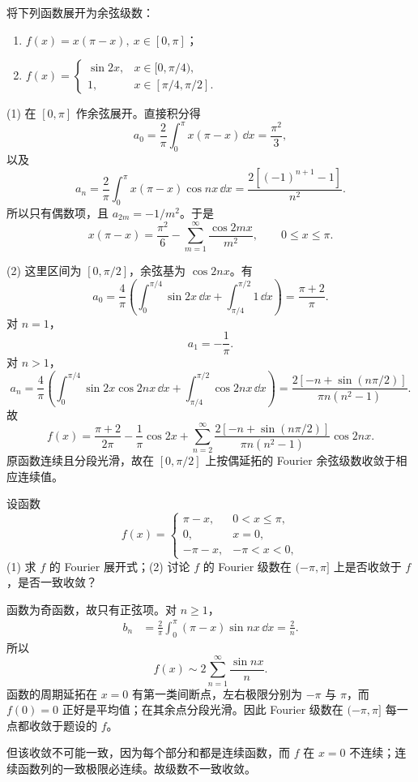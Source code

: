 \begin{xexercise}[6]
将下列函数展开为余弦级数：
  \begin{enumerate}[label=(\arabic*)]
    \item $f(x)=x(\pi-x),\ x\in[0,\pi]$；
    \item $f(x)=\begin{cases}\sin2x,&x\in[0,\pi/4),\\1,&x\in[\pi/4,\pi/2].\end{cases}$
  \end{enumerate}
\end{xexercise}
\begin{xsolution}
(1) 在 $[0,\pi]$ 作余弦展开。直接积分得
\[
  a_0=\frac2\pi\int_0^\pi x(\pi-x)\,\dd x=\frac{\pi^2}{3},
\]
以及
\[
  a_n=\frac2\pi\int_0^\pi x(\pi-x)\cos nx\,\dd x
  =\frac{2[(-1)^{n+1}-1]}{n^2}.
\]
所以只有偶数项，且 $a_{2m}=-1/m^2$。于是
\[
  \boxed{\displaystyle
  x(\pi-x)=\frac{\pi^2}{6}-
  \sum_{m=1}^{\infty}\frac{\cos2mx}{m^2},
  \qquad0\le x\le\pi }.
\]

(2) 这里区间为 $[0,\pi/2]$，余弦基为 $\cos2nx$。有
\[
  a_0=\frac4\pi\left(
  \int_0^{\pi/4}\sin2x\,\dd x+
  \int_{\pi/4}^{\pi/2}1\,\dd x\right)
  =\frac{\pi+2}{\pi}.
\]
对 $n=1$，
\[
  a_1=-\frac1\pi.
\]
对 $n>1$，
\[
  a_n=\frac4\pi\left(
  \int_0^{\pi/4}\sin2x\cos2nx\,\dd x+
  \int_{\pi/4}^{\pi/2}\cos2nx\,\dd x\right)
  =\frac{2[-n+\sin(n\pi/2)]}{\pi n(n^2-1)}.
\]
故
\[
  \boxed{\displaystyle
  f(x)=\frac{\pi+2}{2\pi}-\frac1\pi\cos2x
  +\sum_{n=2}^{\infty}
  \frac{2[-n+\sin(n\pi/2)]}{\pi n(n^2-1)}\cos2nx }.
\]
原函数连续且分段光滑，故在 $[0,\pi/2]$ 上按偶延拓的 Fourier 余弦级数收敛于相应连续值。
\end{xsolution}


\begin{xexercise}[7]
设函数
  \[
    f(x)=\begin{cases}
      \pi-x,&0<x\le\pi,\\
      0,&x=0,\\
      -\pi-x,&-\pi<x<0,
    \end{cases}
  \]
  (1) 求 $f$ 的 Fourier 展开式；(2) 讨论 $f$ 的 Fourier 级数在 $(-\pi,\pi]$ 上是否收敛于 $f$，是否一致收敛？
\end{xexercise}
\begin{xsolution}
函数为奇函数，故只有正弦项。对 $n\ge1$，
\begin{align*}
  b_n
  &=\frac2\pi\int_0^\pi(\pi-x)\sin nx\,\dd x
  =\frac2n.
\end{align*}
所以
\[
  \boxed{\displaystyle
  f(x)\sim2\sum_{n=1}^{\infty}\frac{\sin nx}{n}}.
\]
函数的周期延拓在 $x=0$ 有第一类间断点，左右极限分别为 $-\pi$ 与 $\pi$，而 $f(0)=0$ 正好是平均值；在其余点分段光滑。因此 Fourier 级数在 $(-\pi,\pi]$ 每一点都收敛于题设的 $f$。

但该收敛不可能一致，因为每个部分和都是连续函数，而 $f$ 在 $x=0$ 不连续；连续函数列的一致极限必连续。故级数不一致收敛。
\end{xsolution}


